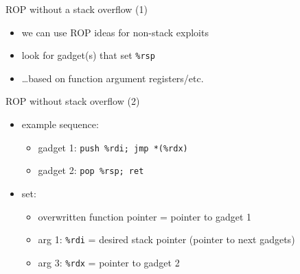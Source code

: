 
\begin{frame}{ROP without a stack overflow (1)}
    \begin{itemize}
    \item we can use ROP ideas for non-stack exploits
    \vspace{.5cm}
    \item look for gadget(s) that set {\tt \%rsp}
    \item \ldots based on function argument registers/etc.
    \end{itemize}
\end{frame}

\begin{frame}{ROP without stack overflow (2)}
    \begin{itemize}
    \item example sequence:
        \begin{itemize}
            \item gadget 1: \texttt{push \%rdi; jmp *(\%rdx)}
            \item gadget 2: \texttt{pop \%rsp; ret}
        \end{itemize}
    \item set:
        \begin{itemize}
        \item overwritten function pointer = pointer to gadget 1
        \item arg 1: {\tt \%rdi} = desired stack pointer (pointer to next gadgets)
        \item arg 3: {\tt \%rdx} = pointer to gadget 2
        \end{itemize}
    \end{itemize}
\end{frame}

